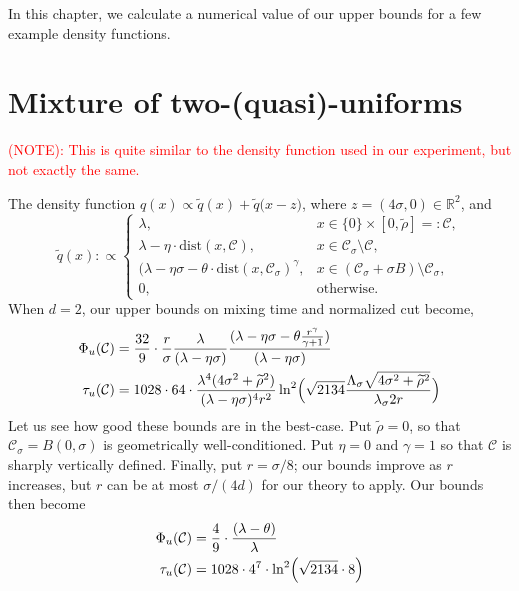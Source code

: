 \documentclass{report}
\newcommand{\Reals}{\mathbb{R}}
\newcommand{\1}{\mathbf{1}}
\newcommand{\mc}[1]{\mathcal{#1}}
\newcommand{\wt}[1]{\widetilde{#1}}
\newcommand{\dist}{\mathrm{dist}}
\theoremstyle{alden}
\theoremstyle{aldenthm}
\theoremstyle{definition}
\theoremstyle{remark}
\begin{document}
In this chapter, we calculate a numerical value of our upper bounds for a few example density functions.

\section{Mixture of two-(quasi)-uniforms}
\textcolor{red}{(NOTE): This is quite similar to the density function used in our experiment, but not exactly the same.}

The density function $q(x) \propto \wt{q}(x) + \wt{q}\bigl(x - z\bigr)$, where $z = (4\sigma,0) \in \Reals^2$, and 
\begin{equation}
\wt{q}(x) :\propto
\begin{cases}
\lambda,~ & x \in \{0\} \times [0,\wt{\rho}] =: \mc{C}, \\
\lambda - \eta \cdot \dist(x,\mc{C}),~ & x \in \mc{C}_{\sigma} \setminus \mc{C}, \\
(\lambda - \eta\sigma - \theta \cdot \dist(x,\mc{C}_{\sigma})^{\gamma}, & x \in (\mc{C}_{\sigma} + \sigma B) \setminus \mc{C}_{\sigma}, \\
0,~ & \textrm{otherwise}.
\end{cases}
\end{equation}
When $d = 2$, our upper bounds on mixing time and normalized cut become,
\begin{align}
\label{eqn: condition_number}
\Phi_u(\mc{C}) 
& = \frac{32}{9} \cdot \frac{r}{\sigma} \frac{\lambda}{(\lambda - \eta \sigma)}
\frac{(\lambda - \eta \sigma - \theta \frac{r^{\gamma}}{\gamma +
		1})}{(\lambda - \eta \sigma)} \\
\tau_u(\mc{C}) & = 1028 \cdot 64 \cdot \frac{\lambda^4
	(4\sigma^2 + \wt{\rho}^2)}{(\lambda - \eta \sigma)^4 r^2} \ln^2\Bigl(\sqrt{2134} \frac{\Lambda_{\sigma} \sqrt{4\sigma^2 + \wt{\rho}^2}}{\lambda_{\sigma} 2r}\Bigr)
\end{align}
Let us see how good these bounds are in the best-case. Put $\wt{\rho} = 0$, so that $\mc{C}_{\sigma} = B(0,\sigma)$ is geometrically well-conditioned. Put $\eta = 0$ and $\gamma = 1$ so that $\mc{C}$ is sharply vertically defined. Finally, put $r = \sigma/8$; our bounds improve as $r$ increases, but $r$ can be at most $\sigma/(4d)$ for our theory to apply. Our bounds then become
\begin{align}
\label{eqn: condition_number2}
\Phi_u(\mc{C}) 
& = \frac{4}{9} \cdot
\frac{(\lambda - \theta)}{\lambda} \\
\tau_u(\mc{C}) & = 1028 \cdot 4^7 \cdot \ln^2\Bigl(\sqrt{2134} \cdot 8 \Bigr)
\end{align}
\end{document}

